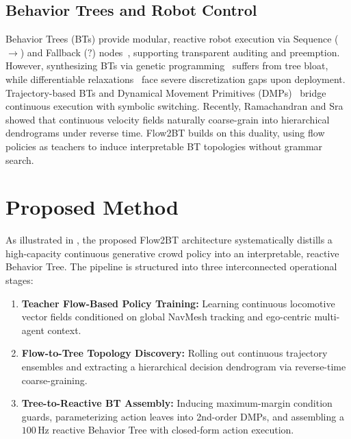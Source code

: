\documentclass{sice-si}
\begin{document}
\subsection{Behavior Trees and Robot Control}
Behavior Trees (BTs) provide modular, reactive robot execution via Sequence ($\to$) and Fallback ($?$) nodes~\cite{colledanchise2018behavior,iovino2022survey}, supporting transparent auditing and preemption. However, synthesizing BTs via genetic programming~\cite{iovino2022survey} suffers from tree bloat, while differentiable relaxations~\cite{huang2025differentiable} face severe discretization gaps upon deployment. 
Trajectory-based BTs and Dynamical Movement Primitives (DMPs)~\cite{chatzilygeroudis2021behavior,ijspeert2013dynamical} bridge continuous execution with symbolic switching. Recently, Ramachandran and Sra~\cite{ramachandran2026trees} showed that continuous velocity fields naturally coarse-grain into hierarchical dendrograms under reverse time. Flow2BT builds on this duality, using flow policies as teachers to induce interpretable BT topologies without grammar search.

\section{Proposed Method}
As illustrated in , the proposed Flow2BT architecture systematically distills a high-capacity continuous generative crowd policy into an interpretable, reactive Behavior Tree. The pipeline is structured into three interconnected operational stages:
\begin{enumerate}[label=\arabic*), labelsep=0.5em]
    \item \textbf{Teacher Flow-Based Policy Training:} Learning continuous locomotive vector fields conditioned on global NavMesh tracking and ego-centric multi-agent context.
    \item \textbf{Flow-to-Tree Topology Discovery:} Rolling out continuous trajectory ensembles and extracting a hierarchical decision dendrogram via reverse-time coarse-graining.
    \item \textbf{Tree-to-Reactive BT Assembly:} Inducing maximum-margin condition guards, parameterizing action leaves into 2nd-order DMPs, and assembling a $100\,\text{Hz}$ reactive Behavior Tree with closed-form action execution.
\end{enumerate}
\end{document}
